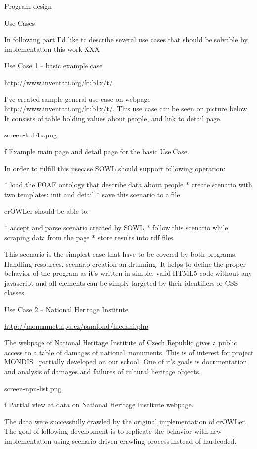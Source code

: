 
\chap Program design


\sec Use Cases

In following part I'd like to describe several use cases that should be solvable by implementation this work XXX


\secc Use Case 1 -- basic example case

\url{http://www.inventati.org/kub1x/t/}

I've created sample general use case on webpage
\url{http://www.inventati.org/kub1x/t/}. This use case can be seen on picture
below. It consists of table holding values about people, and link to detail
page.

\midinsert
\picw=12cm \cinspic screen-kub1x.png
\caption/f Example main page and detail page for the basic Use Case. 
\endinsert

In order to fulfill this usecase SOWL should support following operation: 

\begitems
  * load the FOAF ontology that describe data about people
  * create scenario with two templates: init and detail
  * save this scenario to a file
\enditems

crOWLer should be able to: 

\begitems
  * accept and parse scenario created by SOWL
  * follow this scenario while scraping data from the page
  * store results into rdf files
\enditems

This scenario is the simplest case that have to be covered by both programs.
Handling resources, scenario creation an drunning. It helps to define the
proper behavior of the program as it's written in simple, valid HTML5 code
without any javascript and all elements can be simply targeted by their
identifiers or CSS classes. 


\secc Use Case 2 -- National Heritage Institute

\url{http://monumnet.npu.cz/pamfond/hledani.php}

The webpage of National Heritage Institute of Czech Republic gives a public
access to a table of damages of national monuments. This is of interest for
project MONDIS~ partially developed on our school.
One of it's goals is documentation and analysis of damages and failures of
cultural heritage objects.

\midinsert
\picw=12cm \cinspic screen-npu-list.png
\caption/f Partial view at data on National Heritage Institute webpage. 
\endinsert

The data were successfully crawled by the original implementation of crOWLer.
The goal of following development is to replicate the behavior with new
implementation using scenario driven crawling process instead of hardcoded. 

